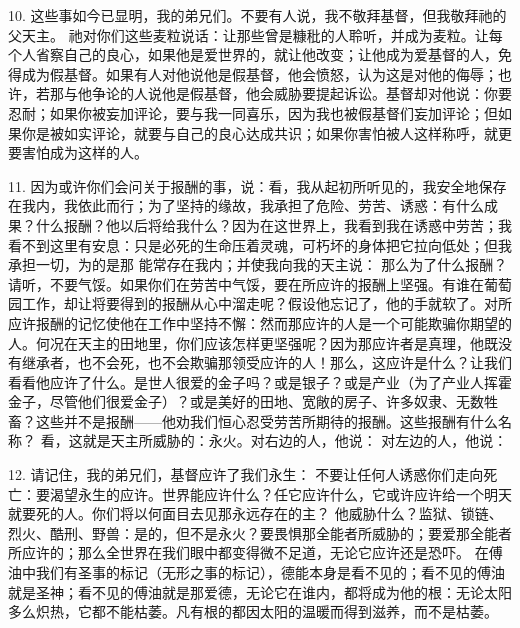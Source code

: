 10. 这些事如今已显明，我的弟兄们。不要有人说，我不敬拜基督，但我敬拜祂的父天主。 祂对你们这些麦粒说话：让那些曾是糠秕的人聆听，并成为麦粒。让每个人省察自己的良心，如果他是爱世界的，就让他改变；让他成为爱基督的人，免得成为假基督。如果有人对他说他是假基督，他会愤怒，认为这是对他的侮辱；也许，若那与他争论的人说他是假基督，他会威胁要提起诉讼。基督却对他说：你要忍耐；如果你被妄加评论，要与我一同喜乐，因为我也被假基督们妄加评论；但如果你是被如实评论，就要与自己的良心达成共识；如果你害怕被人这样称呼，就更要害怕成为这样的人。\par

11.  因为或许你们会问关于报酬的事，说：看，我从起初所听见的，我安全地保存在我内，我依此而行；为了坚持的缘故，我承担了危险、劳苦、诱惑：有什么成果？什么报酬？他以后将给我什么？因为在这世界上，我看到我在诱惑中劳苦；我看不到这里有安息：只是必死的生命压着灵魂，可朽坏的身体把它拉向低处；但我承担一切，为的是那 能常存在我内；并使我向我的天主说： 那么为了什么报酬？请听，不要气馁。如果你们在劳苦中气馁，要在所应许的报酬上坚强。有谁在葡萄园工作，却让将要得到的报酬从心中溜走呢？假设他忘记了，他的手就软了。对所应许报酬的记忆使他在工作中坚持不懈：然而那应许的人是一个可能欺骗你期望的人。何况在天主的田地里，你们应该怎样更坚强呢？因为那应许者是真理，他既没有继承者，也不会死，也不会欺骗那领受应许的人！那么，这应许是什么？让我们看看他应许了什么。是世人很爱的金子吗？或是银子？或是产业（为了产业人挥霍金子，尽管他们很爱金子）？或是美好的田地、宽敞的房子、许多奴隶、无数牲畜？这些并不是报酬——他劝我们恒心忍受劳苦所期待的报酬。这些报酬有什么名称？ 看，这就是天主所威胁的：永火。对右边的人，他说： 对左边的人，他说：\par

12. 请记住，我的弟兄们，基督应许了我们永生： 不要让任何人诱惑你们走向死亡：要渴望永生的应许。世界能应许什么？任它应许什么，它或许应许给一个明天就要死的人。你们将以何面目去见那永远存在的主？ 他威胁什么？监狱、锁链、烈火、酷刑、野兽：是的，但不是永火？要畏惧那全能者所威胁的；要爱那全能者所应许的；那么全世界在我们眼中都变得微不足道，无论它应许还是恐吓。 在傅油中我们有圣事的标记（无形之事的标记），德能本身是看不见的；看不见的傅油就是圣神；看不见的傅油就是那爱德，无论它在谁内，都将成为他的根：无论太阳多么炽热，它都不能枯萎。凡有根的都因太阳的温暖而得到滋养，而不是枯萎。\par

